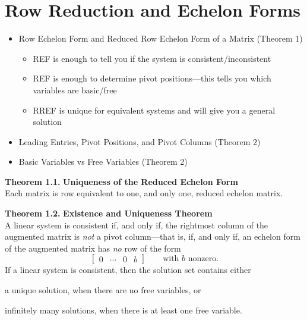\documentclass[10pt]{book}
\newenvironment{boxthm}{\begin{mdframed}[backgroundcolor=gray!30,nobreak=true]}{\end{mdframed}}
\begin{document}
\section{Row Reduction and Echelon Forms}
\begin{itemize}
	\item Row Echelon Form and Reduced Row Echelon Form of a Matrix (Theorem 1)
		\begin{itemize}
			\item REF is enough to tell you if the system is consistent/inconsistent
			\item REF is enough to determine pivot positions---this tells you which variables are basic/free
			\item RREF is unique for equivalent systems and will give you a general solution
		\end{itemize}
	\item Leading Entries, Pivot Positions, and Pivot Columns (Theorem 2)
	\item Basic Variables vs Free Variables (Theorem 2)
\end{itemize}
\begin{boxthm}
	\textbf{Theorem 1.1.}
	\textbf{Uniqueness of the Reduced Echelon Form} \\
	Each matrix is row equivalent to one, and only one, reduced echelon matrix.
\end{boxthm}
\begin{boxthm}
	\textbf{Theorem 1.2.}
	\textbf{Existence and Uniqueness Theorem} \\
	A linear system is consistent if, and only if, the rightmost column of the augmented matrix is \textit{not} a pivot column---that is, if, and only if, an echelon form of the augmented matrix has \textit{no} row of the form
	$$ \begin{bmatrix}0 & \cdots & 0 & b\end{bmatrix} \qquad \text{with $b$ nonzero}.$$
	If a linear system is consistent, then the solution set contains either 
	\begin{enumerate*}[(i)]
		\item a unique solution, when there are no free variables, or
		\item infinitely many solutions, when there is at least one free variable.
	\end{enumerate*}
\end{boxthm}

\pagebreak
\end{document}
